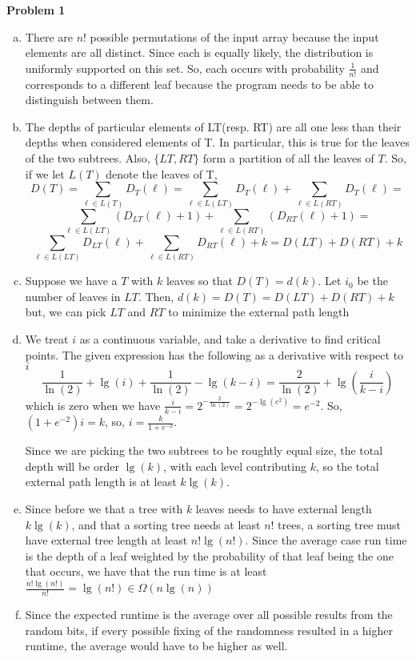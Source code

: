 \documentclass{article}
\begin{document}
\noindent\textbf{Problem 1}\\
\begin{enumerate}[a.]
\item
There are $n!$ possible permutations of the input array because the input elements are all distinct. Since each is equally likely, the distribution is uniformly supported on this set. So, each occurs with probability $\frac{1}{n!}$ and corresponds to a different leaf because the program needs to be able to distinguish between them.

\item
The depths of particular elements of LT(resp. RT) are all one less than their depths when considered elements of T. In particular, this is true for the leaves of the two subtrees. Also, $\{LT,RT\}$ form a partition of all the leaves of $T$. So, if we let $L(T)$ denote the leaves of T,
\[
D(T) =\sum_{\ell \in L(T)} D_T(\ell) = \sum_{\ell \in L(LT)} D_T(\ell) + \sum_{\ell \in L(RT)} D_T(\ell) =\]\[\sum_{\ell \in L(LT)} (D_{LT}(\ell)+1) +\sum_{\ell \in L(RT)} (D_{RT}(\ell) +1) =\]\[ \sum_{\ell \in L(LT)} D_{LT}(\ell) + \sum_{\ell \in L(RT)} D_{RT}(\ell) + k = D(LT)+D(RT)+k
\]

\item
Suppose we have a $T$ with $k$ leaves so that $D(T) =d(k)$. Let $i_0$ be the number of leaves in $LT$. Then, $d(k) = D(T) = D(LT)+D(RT)+k$ but, we can pick $LT$ and $RT$ to minimize the external path length

\item

We treat $i$ as a continuous variable, and take a derivative to find critical points. The given expression has the following as a derivative with respect to $i$
\[
\frac{1}{\ln(2)}+\lg(i) + \frac{1}{\ln(2)} - \lg(k-i) = \frac{2}{\ln(2)} + \lg\left(\frac{i}{k-i}\right)
\]
which is zero when we have $\frac{i}{k-i} = 2^{-\frac{2}{\ln(2)}} = 2^{-\lg(e^2)} = e^{-2}$. So, $(1+e^{-2})i = k$, so, $i = \frac{k}{1+e^{-2}}$. 

Since we are picking the two subtrees to be roughtly equal size, the total depth will be order $\lg(k)$, with each level contributing $k$, so the total external path length is at least $k\lg(k)$.
\item

Since before we that a tree with $k$ leaves needs to have external length $k\lg(k)$, and that a sorting tree needs at least $n!$ trees, a sorting tree must have external tree length at least $n!\lg(n!)$. Since the average case run time is the depth of a leaf weighted by the probability of that leaf being the one that occurs, we have that the run time is at least $\frac{n!\lg(n!)}{n!} =\lg(n!) \in \Omega(n\lg(n))$


\item
Since the expected runtime is the average over all possible results from the random bits, if every possible fixing of the randomness resulted in a higher runtime, the average would have to be higher as well.


\end{enumerate}
\end{document}
